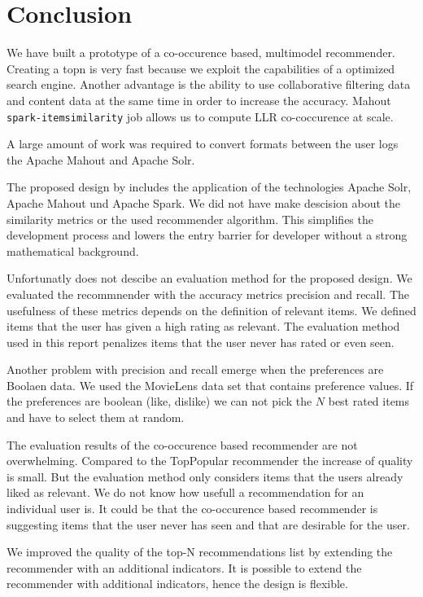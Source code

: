 \section{Conclusion}
\label{sec:conclusion}

We have built a prototype of a co-occurence based, multimodel recommender. Creating a \gls{topn} is very fast because we exploit the capabilities of a optimized search engine. Another advantage is the ability to use collaborative filtering data and content data at the same time in order to increase the accuracy. Mahout \verb|spark-itemsimilarity| job allows us to compute LLR co-coccurence at scale.

A large amount of work was required to convert formats between the user logs the Apache Mahout and Apache Solr.

The proposed design by \cite{Dunning14} includes the application of the technologies Apache Solr, Apache Mahout und Apache Spark. We did not have make descision about the similarity metrics or the used recommender algorithm. This simplifies the development process and lowers the entry barrier for developer without a strong mathematical background. 

Unfortunatly \cite{Dunning14} does not descibe an evaluation method for the proposed design. We evaluated the recommnender with the accuracy metrics precision and recall. The usefulness of these metrics depends on the definition of relevant items. We defined items that the user has given a high rating as relevant. The evaluation method used in this report penalizes items that the user never has rated or even seen. 

Another problem with precision and recall emerge when the preferences are Boolaen data. We used the MovieLens data set that contains preference values. If the preferences are boolean (like, dislike) we can not pick the $N$ best rated items and have to select them at random.

The evaluation results of the co-occurence based recommender are not overwhelming. Compared to the TopPopular recommender the increase of quality is small. But the evaluation method only considers items that the users already liked as relevant. We do not know how usefull a recommendation for an individual user is. It could be that the co-occurence based recommender is suggesting items that the user never has seen and that are desirable for the user.

We improved the quality of the top-N recommendations list by extending the recommender with an additional indicators. It is possible to extend the recommender with additional indicators, hence the design is flexible.

